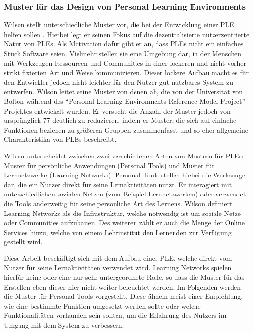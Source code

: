 \subsubsection{Muster für das Design von Personal Learning Environments}\label{section:wilson_patterns}
Wilson stellt unterschiedliche Muster vor, die bei der Entwicklung einer PLE helfen sollen \cite{Wilson2008}. Hierbei legt er seinen Fokus auf die dezentralisierte  nutzerzentrierte Natur von PLEs. Als Motivation dafür gibt er an, dass PLEs nicht ein einfaches Stück Software seien. Vielmehr stellen sie eine Umgebung dar, in der Menschen mit Werkzeugen Ressourcen und Communities in einer lockeren und nicht vorher strikt fixierten Art und Weise kommunizieren. Dieser lockere Aufbau macht es für den Entwickler jedoch nicht leichter für den Nutzer gut nutzbares System zu entwerfen. Wilson leitet seine Muster von denen ab, die von der Universität von Bolton während des "`Personal Learning Environments Reference Model Project"' Projektes entwickelt wurden. Er versucht die Anzahl der Muster jedoch von ursprünglich 77 deutlich zu reduzieren, indem er Muster, die sich auf einfache Funktionen beziehen zu größeren Gruppen zusammenfasst und so eher allgemeine Charakteristika von PLEs beschreibt.

Wilson unterscheidet zwischen zwei verschiedenen Arten von Mustern für PLEs: Muster für persönliche Anwendungen (Personal Tools) und Muster für Lernnetzwerke (Learning Networks). Personal Tools stellen hiebei die Werkzeuge dar, die ein Nutzer direkt für seine Lernaktivitäten nutzt. Er interagiert mit unterschiedlichen sozialen Netzen (zum Beispiel Lernnetzwerken) oder verwendet die Tools anderweitig für seine persönliche Art des Lernens. 
Wilson definiert Learning Networks als die Infrastruktur, welche notwendig ist um soziale Netze oder Communities aufzubauen. Des weiteren zählt er auch die Menge der Online Services hinzu, welche von einem Lehrinstitut den Lernenden zur Verfügung gestellt wird.

Diese Arbeit beschäftigt sich mit dem Aufbau einer PLE, welche direkt vom Nutzer für seine Lernaktivitäten verwendet wird. Learning Networks spielen hierfür keine oder eine nur sehr untergeordnete Rolle, so dass die Muster für das Erstellen eben dieser hier nicht weiter beleuchtet werden. Im Folgenden werden die Muster für Personal Tools vorgestellt. Diese ähneln meist einer Empfehlung, wie eine bestimmte Funktion umgesetzt werden sollte oder welche Funktionalitäten vorhanden sein sollten, um die Erfahrung des Nutzers im Umgang mit dem System zu verbessern.

